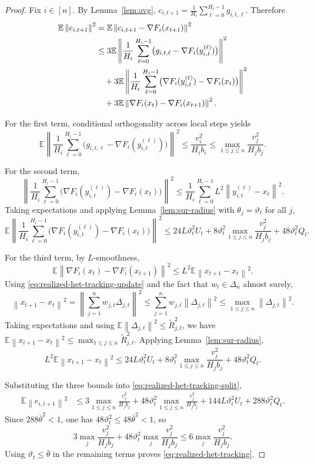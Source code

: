 \documentclass{article}
\theoremstyle{definition}
\newcommand{\EE}{\mathbb E}
\newcommand{\norm}[1]{\left\lVert #1\right\rVert}
\begin{document}
\begin{proof}
Fix $i\in[n]$. By Lemma~\ref{lem:avg}, $c_{i,t+1}
=
\frac1{H_i}\sum_{\ell=0}^{H_i-1} g_{i,t,\ell}$.
Therefore
\begin{align}
\EE\norm{e_{i,t+1}}^2
&=
\EE\norm{c_{i,t+1}-\nabla F_i(x_{t+1})}^2
\notag\\
&\le
3\EE\left\|
\frac1{H_i}\sum_{\ell=0}^{H_i-1}
\bigl(g_{i,t,\ell}-\nabla F_i(y_{i,t}^{(\ell)})\bigr)
\right\|^2
\notag\\
&\quad+
3\EE\left\|
\frac1{H_i}\sum_{\ell=0}^{H_i-1}
\bigl(\nabla F_i(y_{i,t}^{(\ell)})-\nabla F_i(x_t)\bigr)
\right\|^2
\notag\\
&\quad+
3\EE\norm{\nabla F_i(x_t)-\nabla F_i(x_{t+1})}^2.
\label{eq:realized-het-tracking-split}
\end{align}

For the first term, conditional orthogonality across local steps yields
\[
\EE\left\|
\frac1{H_i}\sum_{\ell=0}^{H_i-1}
\bigl(g_{i,t,\ell}-\nabla F_i(y_{i,t}^{(\ell)})\bigr)
\right\|^2
\le
\frac{v_i^2}{H_i b_i}
\le
\max_{1\le j\le n}\frac{v_j^2}{H_j b_j}.
\]

For the second term,
\[
\left\|
\frac1{H_i}\sum_{\ell=0}^{H_i-1}
\bigl(\nabla F_i(y_{i,t}^{(\ell)})-\nabla F_i(x_t)\bigr)
\right\|^2
\le
\frac1{H_i}\sum_{\ell=0}^{H_i-1}
L^2\norm{y_{i,t}^{(\ell)}-x_t}^2.
\]
Taking expectations and applying Lemma~\ref{lem:sur-radius} with $\theta_j=\vartheta_t$ for all $j$,
\[
\EE\left\|
\frac1{H_i}\sum_{\ell=0}^{H_i-1}
\bigl(\nabla F_i(y_{i,t}^{(\ell)})-\nabla F_i(x_t)\bigr)
\right\|^2
\le
24L\vartheta_t^2U_t
+
8\vartheta_t^2\max_{1\le j\le n}\frac{v_j^2}{H_j b_j}
+
48\vartheta_t^2Q_t.
\]

For the third term, by $L$-smoothness,
\[
\EE\norm{\nabla F_i(x_t)-\nabla F_i(x_{t+1})}^2
\le
L^2\EE\norm{x_{t+1}-x_t}^2.
\]
Using \eqref{eq:realized-het-tracking-update} and the fact that $w_t\in\Delta_n$ almost surely,
\[
\norm{x_{t+1}-x_t}^2
=
\left\|
\sum_{j=1}^n w_{j,t}\Delta_{j,t}
\right\|^2
\le
\sum_{j=1}^n w_{j,t}\norm{\Delta_{j,t}}^2
\le
\max_{1\le j\le n}\norm{\Delta_{j,t}}^2.
\]
Taking expectations and using $\EE\norm{\Delta_{j,t}}^2\le \widetilde R_{j,t}^2$,
we have $\EE\norm{x_{t+1}-x_t}^2
\le
\max_{1\le j\le n}\widetilde R_{j,t}^2$.
Applying Lemma~\ref{lem:sur-radius},
\[
L^2\EE\norm{x_{t+1}-x_t}^2
\le
24L\vartheta_t^2U_t
+
8\vartheta_t^2\max_{1\le j\le n}\frac{v_j^2}{H_j b_j}
+
48\vartheta_t^2Q_t.
\]

Substituting the three bounds into \eqref{eq:realized-het-tracking-split},
\begin{align*}
\EE\norm{e_{i,t+1}}^2
&\le
3\max_{1\le j\le n}\frac{v_j^2}{H_j b_j}
+
48\vartheta_t^2\max_{1\le j\le n}\frac{v_j^2}{H_j b_j}
+
144L\vartheta_t^2U_t
+
288\vartheta_t^2Q_t.
\end{align*}
Since $288\bar\theta^2<1$, one has $48\vartheta_t^2\le 48\bar\theta^2<1$, so
\[
3\max_j\frac{v_j^2}{H_j b_j}
+
48\vartheta_t^2\max_j\frac{v_j^2}{H_j b_j}
\le
6\max_j\frac{v_j^2}{H_j b_j}.
\]
Using $\vartheta_t\le\bar\theta$ in the remaining terms proves \eqref{eq:realized-het-tracking}.
\end{proof}
\end{document}
